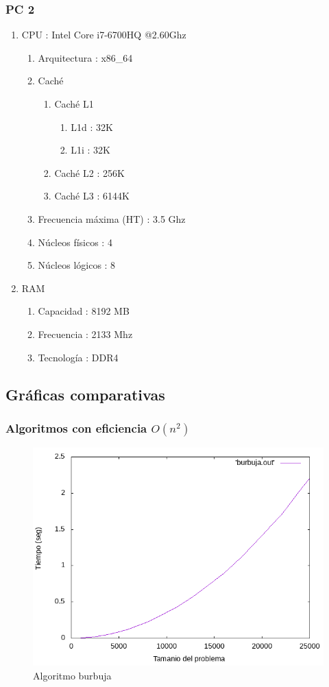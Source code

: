 \documentclass[12pt,spanish]{article}
\begin{document}
\subsubsection{PC 2}
\label{sec:pc2}
\begin{enumerate}
\item CPU : Intel Core i7-6700HQ @2.60Ghz
\begin{enumerate}
	\item Arquitectura : x86\_64
	\item Caché
	\begin{enumerate}
		\item Caché L1
		\begin{enumerate}
			\item L1d : 32K
			\item L1i : 32K
		\end{enumerate}
		\item Caché L2 : 256K
		\item Caché L3 : 6144K
	\end{enumerate}
	\item Frecuencia máxima (HT) : 3.5 Ghz
	\item Núcleos físicos : 4
	\item Núcleos lógicos : 8
\end{enumerate}
\item RAM
\begin{enumerate}
	\item Capacidad : 8192 MB
 	\item Frecuencia : 2133 Mhz
 	\item Tecnología : DDR4
\end{enumerate}
\end{enumerate}
\newpage
\subsection{Gráficas comparativas}

\subsubsection{Algoritmos con eficiencia $O(n^2)$}
\begin{figure}[H]
\centering
\includegraphics[scale=0.75]{empirica_burbuja.png}
\caption{Algoritmo burbuja}
\end{figure}
\end{document}
